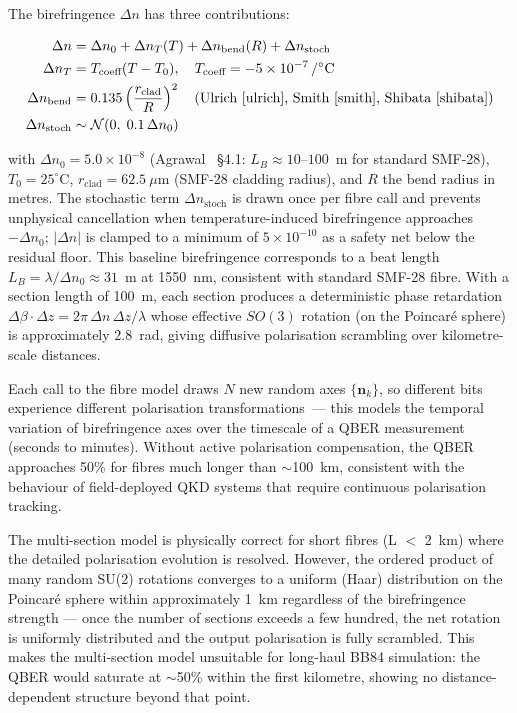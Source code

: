 \documentclass[11pt,a4paper]{article}
\begin{document}
The birefringence $\Delta n$ has three contributions:

\begin{align}
  \Delta n &= \Delta n_0 + \Delta n_T(T) + \Delta n_{\text{bend}}(R)
             + \Delta n_{\text{stoch}} \\
  \Delta n_T &= T_{\text{coeff}} (T - T_0),\quad
    T_{\text{coeff}} = -5\times10^{-7}\,/^\circ\text{C} \\
  \Delta n_{\text{bend}} &= 0.135 \left(\frac{r_{\text{clad}}}{R}\right)^2
    \quad\text{(Ulrich~\cite{ulrich}, Smith~\cite{smith},
             Shibata~\cite{shibata})} \\
  \Delta n_{\text{stoch}} &\sim \mathcal{N}(0,\; 0.1\,\Delta n_0)
\end{align}

with $\Delta n_0 = 5.0\times10^{-8}$ (Agrawal~\cite{agrawal5} \S4.1:
$L_B \approx 10$--$100$~m for standard SMF-28),
$T_0 = 25^\circ$C, $r_{\text{clad}} = 62.5~\mu$m (SMF-28 cladding radius),
and $R$ the bend radius in metres.  The stochastic term $\Delta n_{\text{stoch}}$
is drawn once per fibre call and prevents unphysical cancellation when
temperature-induced birefringence approaches $-\Delta n_0$; $|\Delta n|$ is
clamped to a minimum of $5\times10^{-10}$ as a safety net below the
residual floor.  This baseline birefringence corresponds to a beat length
$L_B = \lambda / \Delta n_0 \approx 31$~m at 1550~nm, consistent with
standard SMF-28 fibre.  With a section length of 100~m, each section
produces a deterministic phase retardation $\Delta\beta\cdot\Delta z =
2\pi\,\Delta n\,\Delta z / \lambda$ whose effective $SO(3)$ rotation
(on the Poincar\'e sphere) is approximately $2.8$~rad, giving diffusive
polarisation scrambling over kilometre-scale distances.

Each call to the fibre model draws $N$ new random axes $\{\mathbf{n}_k\}$,
so different bits experience different polarisation transformations\ ---
this models the temporal variation of birefringence axes over the
timescale of a QBER measurement (seconds to minutes).  Without active
polarisation compensation, the QBER approaches 50\% for fibres much
longer than $\sim$100~km, consistent with the behaviour of field-deployed
QKD systems that require continuous polarisation tracking.

The multi-section model is physically correct for short fibres
(L $<$ 2~km) where the detailed polarisation evolution is resolved.
However, the ordered product of many random SU(2) rotations
converges to a uniform (Haar) distribution on the Poincar\'e
sphere within approximately 1~km regardless of the birefringence
strength --- once the number of sections exceeds a few hundred,
the net rotation is uniformly distributed and the output
polarisation is fully scrambled.  This makes the multi-section
model unsuitable for long-haul BB84 simulation: the QBER would
saturate at $\sim$50\% within the first kilometre, showing no
distance-dependent structure beyond that point.
\end{document}
